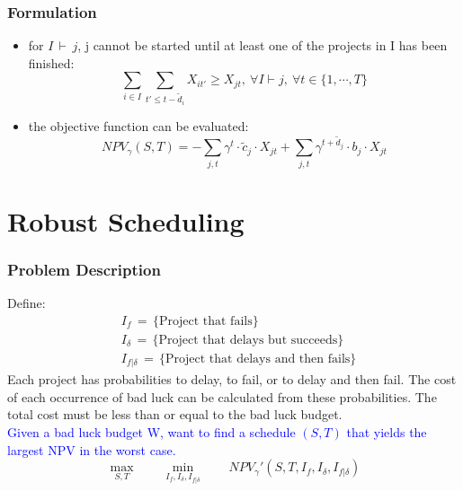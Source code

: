 \documentclass{beamer}
\newcommand{\tblue}{\textcolor{blue}}
\begin{document}
		\begin{frame}
			\frametitle{Formulation}
			\begin{itemize}
				\item for $I\,\vdash\,j$, j cannot be started until at least one of the projects in I has been finished:
					\begin{equation*}
						\label{EqnAnyPrecedence}
						\sum\limits_{i\in I}\sum\limits_{t'\leq t-\tilde{d}_i} X_{it'} \geq X_{jt},~\forall I \vdash j,~\forall t \in \{1,\cdots,T\}
					\end{equation*}
				\item the objective function can be evaluated:
					\begin{equation*}
						NPV_{\gamma}(S,T) = -\sum\limits_{j,t} \gamma^t \cdot \tilde{c}_j \cdot X_{jt} + \sum\limits_{j,t} \gamma^{t+\tilde{d}_j} \cdot b_j \cdot X_{jt}
					\end{equation*}
			\end{itemize}
		\end{frame}



\section{Robust Scheduling}
\begin{frame}
\frametitle{Problem Description}
Define:
\begin{align*}
	&I_f\,=\, \{\mbox{Project that fails}\}\\
	&I_{\delta}\,=\, \{\mbox{Project that delays but succeeds}\}\\
	&I_{f|\delta}\,=\, \{\mbox{Project that delays and then fails}\}
\end{align*}
Each project has probabilities to delay, to fail, or to delay and then fail. The cost of each occurrence of bad luck can be calculated from these probabilities. The total cost must be less than or equal to the bad luck budget.\\
\tblue{Given a bad luck budget W,  want to find a schedule $(S, T)$ that yields the largest NPV in the worst case.}
	\begin{equation*}
		\max_{S,T} \qquad\min_{I_f, I_{\delta}, I_{f|\delta}}\qquad NPV_{\gamma}'(S,T,I_f, I_{\delta}, I_{f|\delta})
	\end{equation*}
\end{frame}
\end{document}
